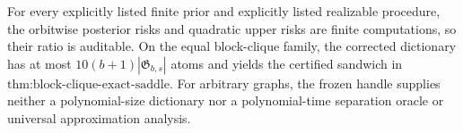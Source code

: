 For every explicitly listed finite prior and explicitly listed realizable procedure, the orbitwise posterior risks and quadratic upper risks are finite computations, so their ratio is auditable.  On the equal block-clique family, the corrected dictionary has at most \(10(b+1)|\mathfrak G_{b,s}|\) atoms and yields the certified sandwich in \(\text{thm:block-clique-exact-saddle}\).  For arbitrary graphs, the frozen handle supplies neither a polynomial-size dictionary nor a polynomial-time separation oracle or universal approximation analysis.